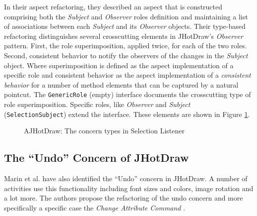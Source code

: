 In their aspect refactoring, they described an aspect that is constructed comprising both the \textit{Subject} and \textit{Observer} roles definition and maintaining a list of associations between each \textit{Subject} and its \textit{Observer} objects.
Their type-based refactoring\cite{marin2005approach} distinguishes several crosscutting elements in JHotDraw's \textit{Observer} pattern. 
First, the role superimposition, applied twice, for each of the two roles. 
Second, consistent behavior to notify the observers of the changes in the \textit{Subject} object.
Where superimposition is defined as the aspect implementation of a specific role and consistent behavior as the aspect implementation of a \textit{consistent behavior} for a number of method elements that can be captured by a natural pointcut.
The \texttt{GenericRole} (empty) interface documents the crosscutting type of role superimposition. 
Specific roles, like \textit{Observer} and \textit{Subject} (\texttt{SelectionSubject}) extend the interface.
These elements are shown in Figure \ref{fig:Concerns_Selection_Listener}.

\begin{figure}[H]
	\centering
  	\caption{AJHotDraw: The concern types in Selection Listener \cite{marin2005approach}}
  	\label{fig:Concerns_Selection_Listener}
\end{figure}

\subsection{The ``Undo'' Concern of JHotDraw}\label{The Undo Concern of JHotDraw}
Marin et al. have also identified the  ``Undo'' concern in JHotDraw. 
A number of activities use this functionality including font sizes and colors, image rotation and a lot more.
The authors propose the refactoring of the undo concern and more specifically a specific case the \textit{Change Attribute Command} \cite{marin2004refactoring}.

